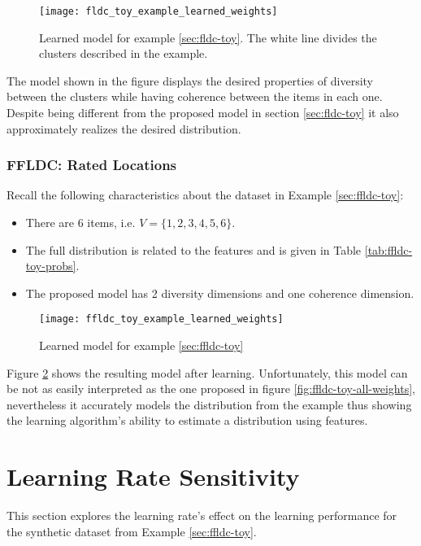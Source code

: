 \begin{figure}
  \centering
  \texttt{[image: fldc\_toy\_example\_learned\_weights]}
  \caption{Learned model for example \ref{sec:fldc-toy}. The white line divides the clusters described in the example.}
  \label{fig:fldc-toy-learned-weights}
\end{figure}

The model shown in the figure displays the desired properties of diversity between the clusters while having coherence between the items in each one. Despite being different from the proposed model in section \ref{sec:fldc-toy} it also approximately realizes the desired distribution.

\subsubsection{FFLDC: Rated Locations}

Recall the following characteristics about the dataset in Example \ref{sec:ffldc-toy}:

\begin{itemize}
  \item There are 6 items, i.e. $V = \{1,2,3,4,5,6\}$.
  \item The full distribution is related to the features and is given in Table \ref{tab:ffldc-toy-probs}.
  \item The proposed model has 2 diversity dimensions and one coherence dimension.
\end{itemize}

\begin{figure}
  \centering
  \texttt{[image: ffldc\_toy\_example\_learned\_weights]}
  \caption{Learned model for example \ref{sec:ffldc-toy}}
  \label{fig:ffldc-toy-learned-weights}
\end{figure}

Figure \ref{fig:ffldc-toy-learned-weights} shows the resulting model after learning. Unfortunately, this model can be not as easily interpreted as the one proposed in figure \ref{fig:ffldc-toy-all-weights}, nevertheless it accurately models the distribution from the example thus showing the learning algorithm's ability to estimate a distribution using features.

\section{Learning Rate Sensitivity}

This section explores the learning rate's effect on the learning performance for the synthetic dataset from Example \ref{sec:ffldc-toy}.


